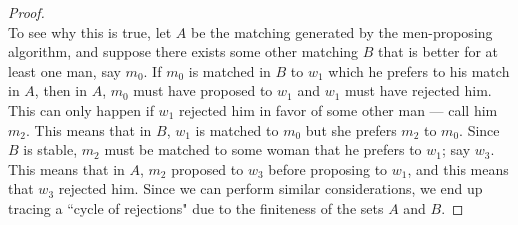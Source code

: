\begin{proof}
 \\



To see why this is true, let $A$ be the matching generated by the men-proposing algorithm, and suppose there exists some other matching $B$ that is better for at least one man, say $m_0$. If $m_0$ is matched in $B$ to $w_1$ which he prefers to his match in $A$, then in $A$, $m_0$ must have proposed to $w_1$ and $w_1$ must have rejected him. This can only happen if $w_1$ rejected him in favor of some other man --- call him $m_2$. This means that in $B$, $w_1$ is matched to $m_0$ but she prefers $m_2$ to $m_0$. Since $B$ is stable, $m_2$ must be matched to some woman that he prefers to $w_1$; say $w_3$. This means that in $A$, $m_2$ proposed to $w_3$ before proposing to $w_1$, and this means that $w_3$ rejected him. Since we can perform similar considerations, we end up tracing a ``cycle of rejections" due to the finiteness of the sets $A$ and $B$. 
\end{proof}

